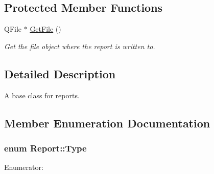 \subsection*{Protected Member Functions}
\begin{DoxyCompactItemize}
\item 
Q\-File $\ast$ \hyperlink{class_report_ad301893ccb48c6c45cc8f56b9596337b}{Get\-File} ()
\begin{DoxyCompactList}\small\item\em Get the file object where the report is written to. \end{DoxyCompactList}\end{DoxyCompactItemize}


\subsection{Detailed Description}
A base class for reports. 

\subsection{Member Enumeration Documentation}
\hypertarget{class_report_a7849fcf198f06b2f94420312e43ec10c}{
\subsubsection[{Type}]{\setlength{\rightskip}{0pt plus 5cm}enum {\bf Report\-::\-Type}}}\label{class_report_a7849fcf198f06b2f94420312e43ec10c}
\begin{Desc}
\item[Enumerator\-: ]\par
\begin{description}
\item[{\em 
\hypertarget{class_report_a7849fcf198f06b2f94420312e43ec10cad6966ee4771e5de35e5e65caa2ea3459}{T\-X\-T}\label{class_report_a7849fcf198f06b2f94420312e43ec10cad6966ee4771e5de35e5e65caa2ea3459}
}]\item[{\em 
\hypertarget{class_report_a7849fcf198f06b2f94420312e43ec10ca34d09774e451f9ceb7e1d7862f8200a2}{X\-M\-L}\label{class_report_a7849fcf198f06b2f94420312e43ec10ca34d09774e451f9ceb7e1d7862f8200a2}
}]\item[{\em 
\hypertarget{class_report_a7849fcf198f06b2f94420312e43ec10ca6558de9645452724f83d48e14a16671f}{X\-M\-L\-V2}\label{class_report_a7849fcf198f06b2f94420312e43ec10ca6558de9645452724f83d48e14a16671f}
}]\item[{\em 
\hypertarget{class_report_a7849fcf198f06b2f94420312e43ec10ca1b1c3875448e1ddf8f4964e4200a7f13}{C\-S\-V}\label{class_report_a7849fcf198f06b2f94420312e43ec10ca1b1c3875448e1ddf8f4964e4200a7f13}
}]\end{description}
\end{Desc}



